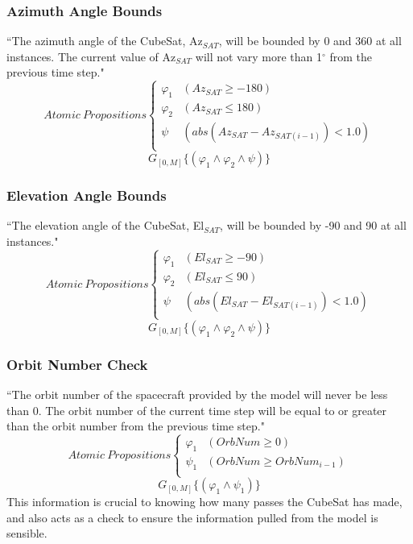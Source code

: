 \subsubsection{\textbf{Azimuth Angle Bounds}}
“The azimuth angle of the CubeSat, Az$_{SAT}$, will be bounded by 0 and 360 at all instances. The current value of Az$_{SAT}$ will not vary more than 1$^{\circ}$ from the previous time step."
\[ Atomic\:Propositions \begin{cases}
  \varphi_1 & (Az_{SAT} \geq -180) \\
  \varphi_2 & (Az_{SAT} \leq 180) \\
  \psi & (abs(Az_{SAT} - Az_{SAT(i-1)}) < 1.0) \\
\end{cases} \]
\begin{equation}
    \label{Spec 2}
    G_{[0,M]} \{(\varphi_1 \wedge \varphi_2 \wedge \psi)\}
\end{equation} 

\subsubsection{\textbf{Elevation Angle Bounds}}
“The elevation angle of the CubeSat, El$_{SAT}$, will be bounded by -90 and 90 at all instances."
\[ Atomic\:Propositions \begin{cases}
  \varphi_1 & (El_{SAT} \geq -90) \\
  \varphi_2 & (El_{SAT} \leq 90) \\
  \psi & (abs(El_{SAT} - El_{SAT(i-1)}) < 1.0) \\
\end{cases} \]
\begin{equation}
    \label{Spec 3}
    G_{[0,M]} \{(\varphi_1 \wedge \varphi_2 \wedge \psi)\}
\end{equation} 

\subsubsection{\textbf{Orbit Number Check}}
“The orbit number of the spacecraft provided by the model will never be less than 0. The orbit number of the current time step will be equal to or greater than the orbit number from the previous time step."
\[ Atomic\:Propositions \begin{cases}
  \varphi_1 & (OrbNum \geq 0) \\
  \psi_1 & (OrbNum \geq OrbNum_{i-1})\\
\end{cases} \]
\begin{equation}
    \label{Spec 4}
    G_{[0,M]} \{(\varphi_1 \wedge \psi_1)\}
\end{equation} 
This information is crucial to knowing how many passes the CubeSat has made, and also acts as a check to ensure the information pulled from the model is sensible.

